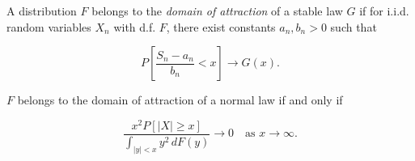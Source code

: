 A distribution $F$ belongs to the \textit{domain of attraction} of a stable law $G$ if for i.i.d. random variables $X_n$ with d.f. $F$, there exist constants $a_n, b_n > 0$ such that

$$P\left[\frac{S_n - a_n}{b_n} < x\right] \to G(x).$$

$F$ belongs to the domain of attraction of a normal law if and only if

$$\frac{x^2 P[|X| \geq x]}{\int_{|y| < x} y^2 \, dF(y)} \to 0 \quad \text{as } x \to \infty.$$
